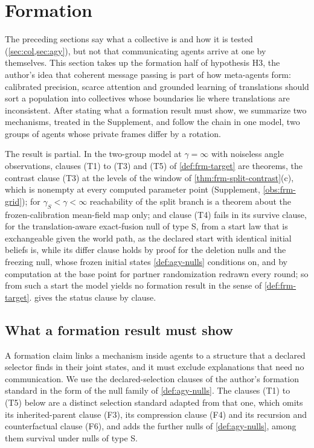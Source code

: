 \section{Formation}\label{sec:frm}

The preceding sections say what a collective is and how it is tested (\cref{sec:col,sec:agy}), but not that communicating agents arrive at one by themselves. This section takes up the formation half of hypothesis H3, the author's idea that coherent message passing is part of how meta-agents form: calibrated precision, scarce attention and grounded learning of translations should sort a population into collectives whose boundaries lie where translations are inconsistent. After stating what a formation result must show, we summarize two mechanisms, treated in the Supplement, and follow the chain in one model, two groups of agents whose private frames differ by a rotation.

The result is partial. In the two-group model at $\gamma=\infty$ with noiseless angle observations, clauses (T1) to (T3) and (T5) of \cref{def:frm-target} are theorems, the contrast clause (T3) at the levels of the window of \cref{thm:frm-split-contrast}(c), which is nonempty at every computed parameter point (Supplement, \cref{obs:frm-grid}); for $\gamma_S<\gamma<\infty$ reachability of the split branch is a theorem about the frozen-calibration mean-field map only; and clause (T4) fails in its survive clause, for the translation-aware exact-fusion null of type S, from a start law that is exchangeable given the world path, as the declared start with identical initial beliefs is, while its differ clause holds by proof for the deletion nulls and the freezing null, whose frozen initial states \cref{def:agy-nulls} conditions on, and by computation at the base point for partner randomization redrawn every round; so from such a start the model yields no formation result in the sense of \cref{def:frm-target}.  gives the status clause by clause.

\subsection{What a formation result must show}\label{sec:frm-target}

A formation claim links a mechanism inside agents to a structure that a declared selector finds in their joint states, and it must exclude explanations that need no communication. We use the declared-selection clauses of the author's formation standard \citep{dennis2026formation} in the form of the null family of \cref{def:agy-nulls}. The clauses (T1) to (T5) below are a distinct selection standard adapted from that one, which omits its inherited-parent clause (F3), its compression clause (F4) and its recursion and counterfactual clause (F6), and adds the further nulls of \cref{def:agy-nulls}, among them survival under nulls of type S.

